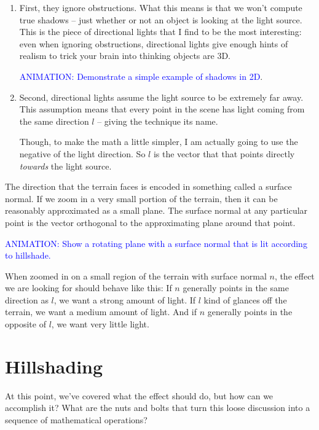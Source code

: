 \documentclass{article}
\newcommand\animation[1]{\textcolor{blue}{ANIMATION: #1}}
\begin{document}
\begin{enumerate}

\item First, they ignore obstructions.
What this means is that we won't compute true shadows -- just whether or not an object is looking at the light source.
This is the piece of directional lights that I find to be the most interesting: even when ignoring obstructions, directional lights give enough hints of realism to trick your brain into thinking objects are 3D.

\animation{Demonstrate a simple example of shadows in 2D}.
	
\item Second, directional lights assume the light source to be extremely far away.
This assumption means that every point in the scene has light coming from the same direction $l$ -- giving the technique its name.

Though, to make the math a little simpler, I am actually going to use the negative of the light direction.
So $l$ is the vector that that points directly \textit{towards} the light source.

\end{enumerate}

The direction that the terrain faces is encoded in something called a surface normal.
If we zoom in a very small portion of the terrain, then it can be reasonably approximated as a small plane.
The surface normal at any particular point is the vector orthogonal to the approximating plane around that point.

\animation{Show a rotating plane with a surface normal that is lit according to hillshade.}

When zoomed in on a small region of the terrain with surface normal $n$, the effect we are looking for should behave like this:
If $n$ generally points in the same direction as $l$, we want a strong amount of light.
If $l$ kind of glances off the terrain, we want a medium amount of light.
And if $n$ generally points in the opposite of $l$, we want very little light.

\section{Hillshading}

At this point, we've covered what the effect should do, but how can we accomplish it?
What are the nuts and bolts that turn this loose discussion into a sequence of mathematical operations?
\end{document}
